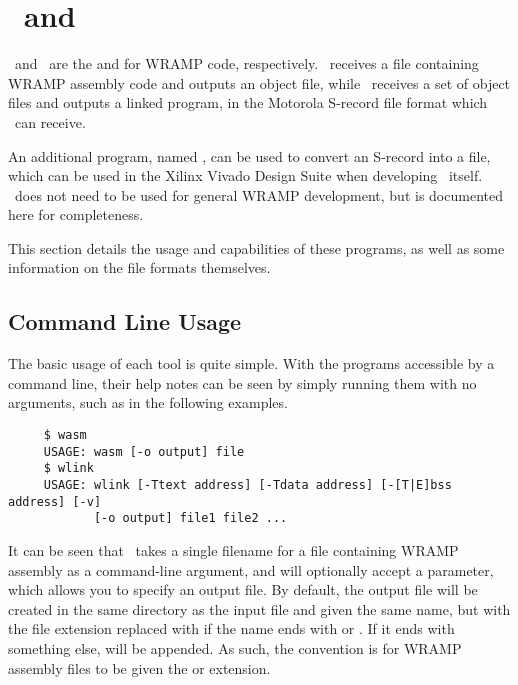 \setcounter{secnumdepth}{0}

\section{\wasm\ and \wlink}

\wasm\ and \wlink\ are the  and  for WRAMP code,
respectively. \wasm\ receives a file containing WRAMP assembly code and
outputs an object file, while \wlink\ receives a set of object files
and outputs a linked program, in the Motorola S-record file format which
\WRAMPmon\ can receive.

An additional program, named \trim, can be used to convert an S-record
into a  file, which can be used in the Xilinx Vivado Design
Suite when developing \WRAMPmon\ itself. \trim\ does not need to be
used for general WRAMP development, but is documented here for completeness.

This section details the usage and capabilities of these programs, as well as
some information on the file formats themselves.

\subsection{Command Line Usage}

The basic usage of each tool is quite simple. With the programs accessible by
a command line, their help notes can be seen by simply running them with no
arguments, such as in the following examples.

\begin{verbatim}
     $ wasm
     USAGE: wasm [-o output] file
     $ wlink
     USAGE: wlink [-Ttext address] [-Tdata address] [-[T|E]bss address] [-v] 
            [-o output] file1 file2 ...
\end{verbatim}

It can be seen that \wasm\ takes a single filename for a file containing
WRAMP assembly as a command-line argument, and will optionally accept a
 parameter, which allows you to specify an output file. By 
default, the output file will be created in the same directory as the input
file and given the same name, but with the file extension replaced with
 if the name ends with  or . If it
ends with something else,  will be appended. As such, the
convention is for WRAMP assembly files to be given the  or
 extension.

